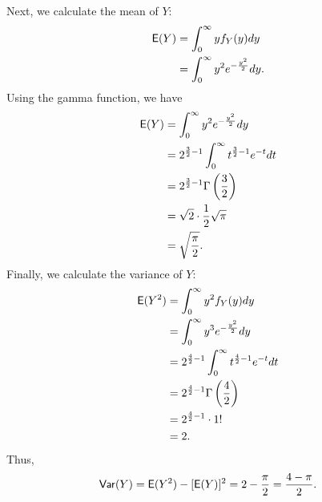 \documentclass[12pt]{article}
\newcommand{\E}{{\sf E}}
\newcommand{\Var}{{\sf Var}}
\newenvironment{problem}[2][Problem]{\begin{trivlist}
\item[\hskip \labelsep {\bfseries #1}\hskip \labelsep {\bfseries #2.}]}
{\end{trivlist}}
\begin{document}
\begin{problem} {5}
\begin{itemize}
\begin{itemize}
      Next, we calculate the mean of $Y$:
      \[
        \begin{aligned}
          \E(Y) &= \int_0^\infty y
          f_Y(y) dy \\
          &= \int_0^\infty y^2 e^{-\frac{y^2}{2}} dy.
        \end{aligned}
      \]
      Using the gamma function, we have
      \[
        \begin{aligned}
          \E(Y) &= \int_0^\infty y^2 e^{-\frac{y^2}{2}} dy \\
          &= 2^{\frac{3}{2}-1} \int_0^\infty t^{\frac{3}{2}-1} e^{-t} dt \\
          &= 2^{\frac{3}{2}-1} \Gamma\left(\frac{3}{2}\right) \\
          &= \sqrt{2} \cdot \frac{1}{2} \sqrt{\pi} \\
          &= \sqrt{\frac{\pi}{2}}.
        \end{aligned}
      \]
      Finally, we calculate the variance of $Y$:
      \[
        \begin{aligned}
          \E(Y^2) &= \int_0^\infty y^2 f_Y(y) dy \\
          &= \int_0^\infty y^3 e^{-\frac{y^2}{2}} dy \\
          &= 2^{\frac{4}{2}-1} \int_0^\infty t^{\frac{4}{2}-1} e^{-t} dt \\
          &= 2^{\frac{4}{2}-1} \Gamma\left(\frac{4}{2}\right) \\
          &= 2^{\frac{4}{2}-1} \cdot 1! \\
          &= 2.
        \end{aligned}
      \]
      Thus,
      \[
        \Var(Y) = \E(Y^2) - [\E(Y)]^2 
        = 2 - \frac{\pi}{2} = \frac{4 - \pi}{2}.
      \]
  \end{itemize}
\end{itemize}
\end{problem}
\end{document}
